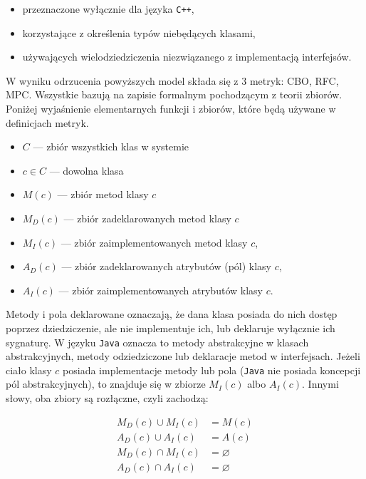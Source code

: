 \begin{itemize}
    \item przeznaczone wyłącznie dla języka \texttt{C++},
    \item korzystające z określenia typów niebędących klasami,
    \item używających wielodziedziczenia niezwiązanego z implementacją interfejsów.
\end{itemize}

W wyniku odrzucenia powyższych model składa się z 3 metryk: \acrshort{CBO}, \acrshort{RFC}, \acrshort{MPC}.
Wszystkie bazują na zapisie formalnym pochodzącym z teorii zbiorów.
Poniżej wyjaśnienie elementarnych funkcji i zbiorów, które będą używane w definicjach metryk.

\begin{itemize}
    \item \(C\) --- zbiór wszystkich klas w systemie
    \item \(c \in C\) --- dowolna klasa
    \item \(M(c)\) --- zbiór metod klasy \(c\)
    \item \(M_{D}(c)\) --- zbiór zadeklarowanych metod klasy \(c\)
    \item \(M_{I}(c)\) --- zbiór zaimplementowanych metod klasy \(c\),
    \item \(A_{D}(c)\) --- zbiór zadeklarowanych atrybutów (pól) klasy \(c\),
    \item \(A_{I}(c)\) --- zbiór zaimplementowanych atrybutów klasy \(c\).
\end{itemize}

Metody i pola deklarowane oznaczają, że dana klasa posiada do nich dostęp poprzez dziedziczenie, ale nie
implementuje ich, lub deklaruje wyłącznie ich sygnaturę.
W języku \texttt{Java} oznacza to metody abstrakcyjne w klasach abstrakcyjnych, metody odziedziczone lub deklaracje
metod w interfejsach.
Jeżeli ciało klasy \(c\) posiada implementacje metody lub pola (\texttt{Java} nie posiada koncepcji pól
abstrakcyjnych), to znajduje się w zbiorze \(M_{I}(c)\) albo \(A_{I}(c)\).
Innymi słowy, oba zbiory są rozłączne, czyli zachodzą:

\begin{equation*}
    \begin{aligned}
     M_{D}(c) \cup M_{I}(c) &= M(c) \\
     A_{D}(c) \cup A_{I}(c) &= A(c) \\
     M_{D}(c) \cap M_{I}(c) &= \varnothing \\
     A_{D}(c) \cap A_{I}(c) &= \varnothing
    \end{aligned}
\end{equation*}


